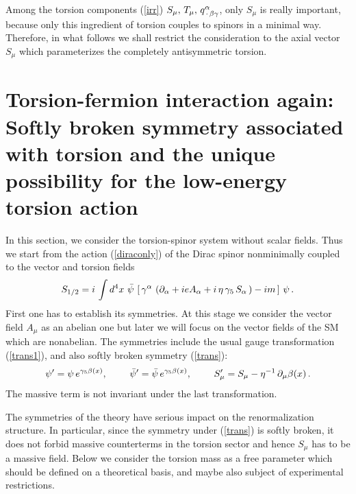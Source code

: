 Among the torsion components
(\ref{irr}) $S_\mu,\,T_\mu,\,q^\alpha_{\,\cdot\,\beta\gamma}$, only 
$S_\mu$ is really important, because only this 
ingredient of torsion couples to spinors in a minimal way. 
Therefore, in what follows we shall restrict the consideration 
to the axial vector $S_\mu$ which parameterizes the
completely antisymmetric torsion.


\section{Torsion-fermion interaction again:
Softly broken symmetry associated with torsion
and the unique possibility for the low-energy torsion action}

In this section, we  consider the torsion-spinor system 
without scalar fields. Thus we start 
from the action (\ref{diraconly}) of the Dirac spinor nonminimally 
coupled to the vector and torsion fields
$$
S_{1/2}= i\,\int d^4x \,\, {\bar \psi}\, \left[
\,\gamma^\alpha \,\left( {\partial}_\alpha + ieA_\alpha 
+ i\,\eta\,\gamma_5\,S_\alpha\,\right) - im \,\right]\,\psi\,.
$$
First one has to establish its symmetries. At this stage we 
consider the vector field $A_\mu$ as an abelian one but later 
we will focus on the vector fields of the SM which are nonabelian. 
The symmetries include the usual gauge transformation (\ref{trans1}), 
and also softly broken symmetry (\ref{trans}):
$$
 \psi' = \psi\,e^{\gamma_5\beta(x)}
,\,\,\,\,\,\,\,\,\,\,\,\,\,\,
{\bar {\psi}}' = {\bar {\psi}}\,e^{\gamma_5\beta(x)}
,\,\,\,\,\,\,\,\,\,\,\,\,\,\,
S_\mu ' = S_\mu - {\eta}^{-1}\, \partial_\mu\beta(x)\,.
$$
The massive term is not invariant under the last transformation.

The symmetries of the theory have serious impact on the renormalization 
structure. In particular, since the symmetry under (\ref{trans}) is softly
broken, it does not forbid massive counterterms in the torsion sector and 
hence  $S_\mu$ has to be a massive field.
Below we consider the torsion mass as a free parameter which should be 
defined on a theoretical basis, and maybe also subject of 
experimental restrictions.

